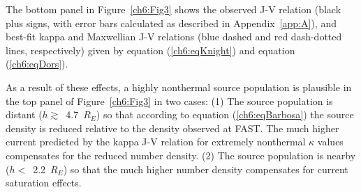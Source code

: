   The bottom panel in Figure~\ref{ch6:Fig3} shows the observed J-V relation
  (black plus signs, with error bars calculated as described in
  Appendix~\ref{app:A}), and best-fit kappa and Maxwellian J-V relations (blue
  dashed and red dash-dotted lines, respectively) given by equation
  (\ref{ch6:eqKnight}) and equation (\ref{ch6:eqDors}).


  As a result of these effects, a highly nonthermal source population is
  plausible in the top panel of Figure~\ref{ch6:Fig3} in two cases: (1) The
  source population is distant ($h \gtrsim$~4.7~$R_E$) so that according to
  equation (\ref{ch6:eqBarbosa}) the source density is reduced relative to the
  density observed at FAST. The much higher current predicted by the kappa J-V
  relation for extremely nonthermal $\kappa$ values compensates for the reduced
  number density. (2) The source population is nearby ($h <$~2.2~$R_E$) so that
  the much higher number density compensates for current saturation effects.

